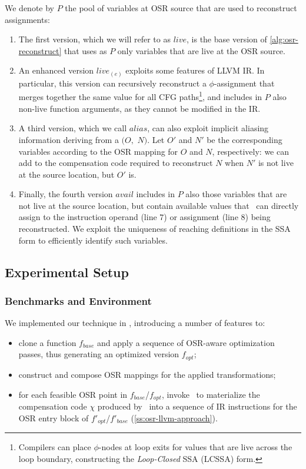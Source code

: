 We denote by $P$ the pool of variables at OSR source that are used to reconstruct assignments:
\begin{enumerate}
 \item The first version, which we will refer to as $live$, is the base version of \myalgorithm\ref{alg:osr-reconstruct} that uses as $P$ only variables that are live at the OSR source.
 \item An enhanced version $live_{(e)}$ exploits some features of LLVM IR. In particular, this version can recursively reconstruct a $\phi$-assignment that merges together the same value for all CFG paths\footnote{Compilers can place $\phi$-nodes at loop exits for values that are live across the loop boundary, constructing the {\em Loop-Closed} SSA (LCSSA) form.}, and includes in $P$ also non-live function arguments, as they cannot be modified in the IR.
 \item A third version, which we call $alias$, can also exploit implicit aliasing information deriving from a \RAUW$(O,$ $N)$. Let $O'$ and $N'$ be the corresponding variables according to the OSR mapping for $O$ and $N$, respectively: we can add  to the compensation code required to reconstruct $N$ when $N'$ is not live at the source location, but $O'$ is.
 \item Finally, the fourth version $avail$ includes in $P$ also those variables that are not live at the source location, but contain available values that \reconstruct\ can directly assign to the instruction operand (line $7$) or assignment (line $8$) being reconstructed. We exploit the uniqueness of reaching definitions in the SSA form to efficiently identify such variables.
\end{enumerate}

\subsection{Experimental Setup}
\label{ss:bc-exp-setup}

\subsubsection*{Benchmarks and Environment}
We implemented our technique in \tinyvm, introducing a number of features to:
\begin{itemize}
 \item clone a function $f_{base}$ and apply a sequence of OSR-aware optimization passes, thus generating an optimized version $f_{opt}$;
 \item construct and compose OSR mappings for the applied transformations;
 \item for each feasible OSR point in $f_{base}$/$f_{opt}$, invoke \osrkit\ to materialize the compensation code $\chi$ produced by \reconstruct\ into a sequence of IR instructions for the OSR entry block of $f'_{opt}$/$f'_{base}$ (\mysection\ref{ss:osr-llvm-approach}).
\end{itemize}


